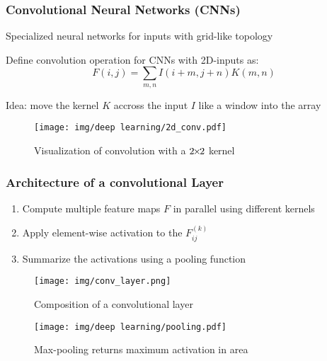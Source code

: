 \documentclass{beamer}
\renewcommand{\k}[2]{#1^{(#2)}}
\newcommand{\PLH}{{\mkern-2mu\times\mkern-2mu}}
\begin{document}
\begin{frame}
    \frametitle{Convolutional Neural Networks (CNNs)}
    Specialized neural networks for inputs with grid-like topology
    
    \begin{minipage}[t]{0.49\textwidth}
        \vspace{1em}
        Define convolution operation for CNNs with 2D-inputs as:
        \begin{equation*}
            F(i,j) = \sum_{m, n} I(i+m, j+n)K(m,n)
        \end{equation*}
        
        Idea: move the kernel $K$ accross the input $I$ like a window into the array
    \end{minipage}
    \begin{minipage}[t]{0.49\textwidth}
        \begin{figure}
            \texttt{[image: img/deep learning/2d\_conv.pdf]}
            \hspace{-4.5em}
            \caption{Visualization of convolution with a $2\PLH2$ kernel \cite{textbook}}
        \end{figure}
    \end{minipage}
\end{frame}

\begin{frame}
    \frametitle{Architecture of a convolutional Layer}
    {\setlength{\leftmargini}{0cm}
    \begin{enumerate}
        \item Compute multiple feature maps $F$ in parallel using different kernels
        \item Apply element-wise activation to the $\k{F}{k}_{ij}$
        \item Summarize the activations using a pooling function
    \end{enumerate}}
    
    \vspace{2em}
    \begin{minipage}[b]{0.52\textwidth}
        \begin{figure}
            \texttt{[image: img/conv\_layer.png]}
            \caption{Composition of a convolutional layer \cite{conv_layer}}
        \end{figure}
    \end{minipage}
    \begin{minipage}[b]{0.45\textwidth}
        \begin{figure}
            \texttt{[image: img/deep learning/pooling.pdf]}
            \caption{Max-pooling returns maximum activation in area \cite{textbook}}
        \end{figure}
    \end{minipage}
\end{frame}
\end{document}
